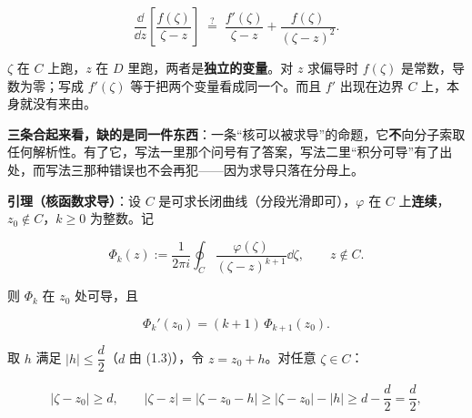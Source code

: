 \documentclass[11pt]{ctexart}
\let\origsubhdr\subhdr
\renewcommand{\subhdr}[1]{\par\origsubhdr{#1}}
\begin{document}

\begin{equation*}
\frac{\dd}{\dd z}\left[\frac{f(\zeta)}{\zeta-z}\right]\;\overset{?}{=}\;\frac{f'(\zeta)}{\zeta-z}+\frac{f(\zeta)}{(\zeta-z)^2}.
\end{equation*}

$\zeta$ 在 $C$ 上跑，$z$ 在 $D$ 里跑，两者是\textbf{独立的变量}。对 $z$ 求偏导时 $f(\zeta)$ 是常数，导数为零；写成 $f'(\zeta)$ 等于把两个变量看成同一个。而且 $f'$ 出现在边界 $C$ 上，本身就没有来由。


\flowerrule

\noindent\textbf{三条合起来看，缺的是同一件东西}：一条“核可以被求导”的命题，它\textbf{不}向分子索取任何解析性。有了它，写法一里那个问号有了答案，写法二里“积分可导”有了出处，而写法三那种错误也不会再犯——因为求导只落在分母上。



\textbf{引理（核函数求导）}：设 $C$ 是可求长闭曲线（分段光滑即可），$\varphi$ 在 $C$ 上\textbf{连续}，$z_0\notin C$，$k\ge0$ 为整数。记

\begin{equation}
\Phi_k(z):=\frac{1}{2\pi i}\oint_C\frac{\varphi(\zeta)}{(\zeta-z)^{k+1}}\dd\zeta ,
\qquad z\notin C .
\tag{3.1}
\end{equation}

则 $\Phi_k$ 在 $z_0$ 处可导，且

\begin{equation}
\Phi_k'(z_0)=(k+1)\,\Phi_{k+1}(z_0).
\tag{3.2}
\end{equation}



取 $h$ 满足 $|h|\le \dfrac{d}{2}$（$d$ 由 (1.3)），令 $z=z_0+h$。对任意 $\zeta\in C$：

\begin{equation}
|\zeta-z_0|\ge d,\qquad
|\zeta-z|=|\zeta-z_0-h|\ge |\zeta-z_0|-|h|\ge d-\frac{d}{2}=\frac{d}{2},
\tag{3.3a}
\end{equation}
\end{document}
